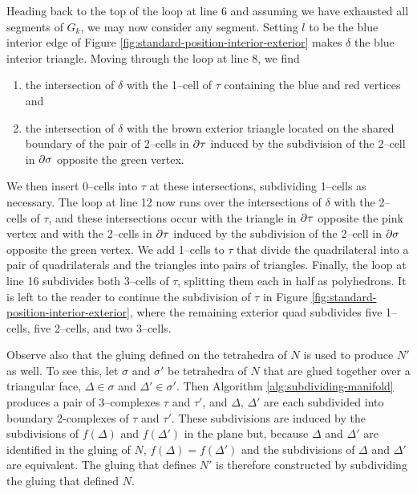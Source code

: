 Heading back to the top of the loop at line 6 and assuming we have exhausted all segments of $G_k$, we may now consider any segment.
Setting $l$ to be the blue interior edge of Figure \ref{fig:standard-position-interior-exterior} makes $\delta$ the blue interior triangle.
Moving through the loop at line 8, we find
\begin{enumerate}
	\item the intersection of $\delta$ with the 1--cell of $\tau$ containing the blue and red vertices and 
	\item the intersection of $\delta$ with the brown exterior triangle located on the shared boundary of the pair of 2--cells in $\partial\tau$ induced by the subdivision of the 2--cell in $\partial\sigma$ opposite the green vertex.
\end{enumerate}
We then insert 0--cells into $\tau$ at these intersections, subdividing 1--cells as necessary.
The loop at line 12 now runs over the intersections of $\delta$ with the 2--cells of $\tau$, and these intersections occur with the triangle in $\partial\tau$ opposite the pink vertex and with the 2--cells in $\partial\tau$ induced by the subdivision of the 2--cell in $\partial\sigma$ opposite the green vertex.
We add 1--cells to $\tau$ that divide the quadrilateral into a pair of quadrilaterals and the triangles into pairs of triangles.
Finally, the loop at line 16 subdivides both 3--cells of $\tau$, splitting them each in half as polyhedrons.
It is left to the reader to continue the subdivision of $\tau$ in Figure \ref{fig:standard-position-interior-exterior}, where the remaining exterior quad subdivides five 1--cells, five 2--cells, and two 3--cells.

Observe also that the gluing defined on the tetrahedra of $N$ is used to produce $N'$ as well.
To see this, let $\sigma$ and $\sigma'$ be tetrahedra of $N$ that are glued together over a triangular face, $\Delta\in\sigma$ and $\Delta'\in\sigma'$.
Then Algorithm \ref{alg:subdividing-manifold} produces a pair of 3--complexes $\tau$ and $\tau'$, and $\Delta$, $\Delta'$ are each subdivided into boundary 2-complexes of $\tau$ and $\tau'$.
These subdivisions are induced by the subdivisions of $f(\Delta)$ and $f(\Delta')$ in the plane but, because $\Delta$ and $\Delta'$ are identified in the gluing of $N$, $f(\Delta)=f(\Delta')$ and the subdivisions of $\Delta$ and $\Delta'$ are equivalent.
The gluing that defines $N'$ is therefore constructed by subdividing the gluing that defined $N$.

